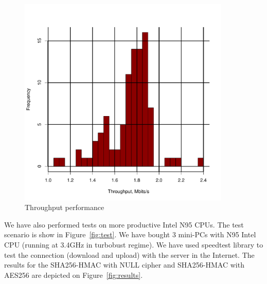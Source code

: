 \begin{figure}[h!]
\centering
\includegraphics[width=0.9\textwidth]{graphics/iperf.pdf}
\caption{Throughput performance}
\label{fig:tput}
\end{figure}



We have also performed tests on more productive Intel N95 CPUs. The test scenario is show in Figure~\ref{fig:test}.
We have bought 3 mini-PCs with N95 Intel CPU (running at 3.4GHz in turbobust regime). We have used speedtest library 
to test the connection (download and upload) with the server in the Internet. The results for the SHA256-HMAC with NULL
cipher and SHA256-HMAC with AES256 are depicted on Figure~\ref{fig:results}.

